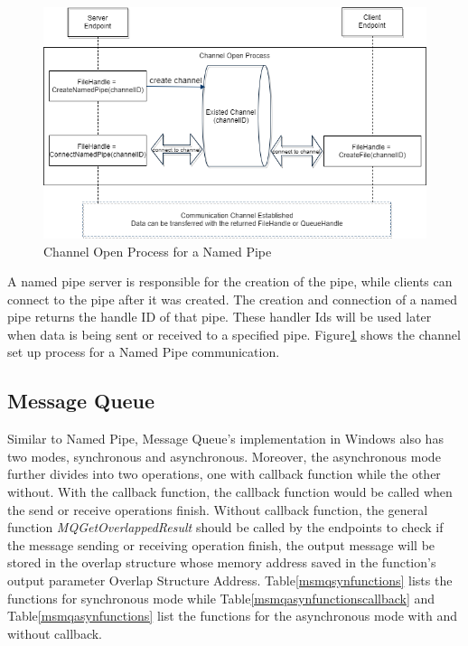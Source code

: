 \begin{figure}[H]
\centerline{\includegraphics[scale=0.55]{Figures/namepipechannelopen}}
 \caption{Channel Open Process for a Named Pipe}
\label{namedpipeopen}
\end{figure}
    
A named pipe server is responsible for the creation of the pipe, while clients can connect to the pipe after it was created. The creation and connection of a named pipe returns the handle ID of that pipe. These handler Ids will be used later when data is being sent or received to a specified pipe. Figure\ref{namedpipeopen} shows the channel set up process for a Named Pipe communication.


\subsection{Message Queue}
Similar to Named Pipe, Message Queue's implementation in Windows also has two modes, synchronous and asynchronous. Moreover, the asynchronous mode further divides into two operations, one with callback function while the other without. With the callback function, the callback function would be called when the send or receive operations finish. Without callback function, the general function \textit{MQGetOverlappedResult} should be called by the endpoints to check if the message sending or receiving operation finish, the output message will be stored in the overlap structure whose memory address saved in the function's output parameter Overlap Structure Address. Table\ref{msmqsynfunctions} lists the functions for synchronous mode while Table\ref{msmqasynfunctionscallback} and Table\ref{msmqasynfunctions} list the functions for the asynchronous mode with and without callback. 

